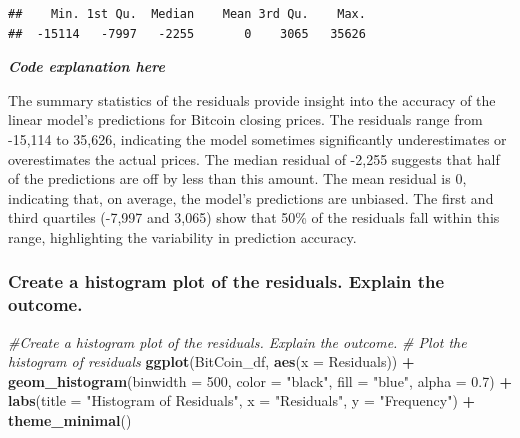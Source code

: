 \documentclass[
]{book}
\newenvironment{Shaded}{\begin{snugshade}}{\end{snugshade}}
\newcommand{\AttributeTok}[1]{\textcolor[rgb]{0.13,0.29,0.53}{#1}}
\newcommand{\CommentTok}[1]{\textcolor[rgb]{0.56,0.35,0.01}{\textit{#1}}}
\newcommand{\DecValTok}[1]{\textcolor[rgb]{0.00,0.00,0.81}{#1}}
\newcommand{\FloatTok}[1]{\textcolor[rgb]{0.00,0.00,0.81}{#1}}
\newcommand{\FunctionTok}[1]{\textcolor[rgb]{0.13,0.29,0.53}{\textbf{#1}}}
\newcommand{\NormalTok}[1]{#1}
\newcommand{\SpecialCharTok}[1]{\textcolor[rgb]{0.81,0.36,0.00}{\textbf{#1}}}
\newcommand{\StringTok}[1]{\textcolor[rgb]{0.31,0.60,0.02}{#1}}
\begin{document}
\begin{Shaded}
\end{Shaded}

\begin{verbatim}
##    Min. 1st Qu.  Median    Mean 3rd Qu.    Max. 
##  -15114   -7997   -2255       0    3065   35626
\end{verbatim}

\emph{\textbf{Code explanation here}}

The summary statistics of the residuals provide insight into the accuracy of the linear model's predictions for Bitcoin closing prices. The residuals range from -15,114 to 35,626, indicating the model sometimes significantly underestimates or overestimates the actual prices. The median residual of -2,255 suggests that half of the predictions are off by less than this amount. The mean residual is 0, indicating that, on average, the model's predictions are unbiased. The first and third quartiles (-7,997 and 3,065) show that 50\% of the residuals fall within this range, highlighting the variability in prediction accuracy.

\subsubsection{Create a histogram plot of the residuals. Explain the outcome.}\label{create-a-histogram-plot-of-the-residuals.-explain-the-outcome.}

\begin{Shaded}
\begin{Highlighting}[]
\CommentTok{\#Create a histogram plot of the residuals. Explain the outcome.}
  \CommentTok{\# Plot the histogram of residuals}
  \FunctionTok{ggplot}\NormalTok{(BitCoin\_df, }\FunctionTok{aes}\NormalTok{(}\AttributeTok{x =}\NormalTok{ Residuals)) }\SpecialCharTok{+}
  \FunctionTok{geom\_histogram}\NormalTok{(}\AttributeTok{binwidth =} \DecValTok{500}\NormalTok{, }\AttributeTok{color =} \StringTok{"black"}\NormalTok{, }\AttributeTok{fill =} \StringTok{"blue"}\NormalTok{, }\AttributeTok{alpha =} \FloatTok{0.7}\NormalTok{) }\SpecialCharTok{+}
  \FunctionTok{labs}\NormalTok{(}\AttributeTok{title =} \StringTok{"Histogram of Residuals"}\NormalTok{,}
       \AttributeTok{x =} \StringTok{"Residuals"}\NormalTok{,}
       \AttributeTok{y =} \StringTok{"Frequency"}\NormalTok{) }\SpecialCharTok{+}
  \FunctionTok{theme\_minimal}\NormalTok{()}
\end{Highlighting}
\end{Shaded}
\end{document}
